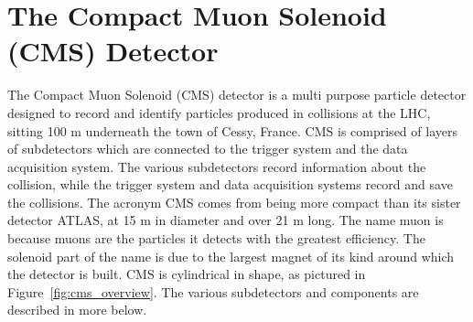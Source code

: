 \section{The Compact Muon Solenoid (CMS) Detector}
The Compact Muon Solenoid (CMS) detector is a multi purpose particle detector designed to record and identify particles produced in collisions at the LHC, sitting 100 m underneath
the town of Cessy, France. CMS is comprised of layers of subdetectors which are connected to the trigger system and the data acquisition system.
The various subdetectors record information about the collision, while the trigger system and
data acquisition systems record and save the collisions. The acronym CMS comes from being more compact than its sister detector ATLAS, at 15 m in diameter and
over 21 m long. The name muon is because muons are the particles it detects with the greatest efficiency. The solenoid part of the name is due to the largest magnet of its kind
around which the detector is built. CMS is cylindrical in shape, as pictured in Figure~\ref{fig:cms_overview}. The various subdetectors and components are described in more
below. 



